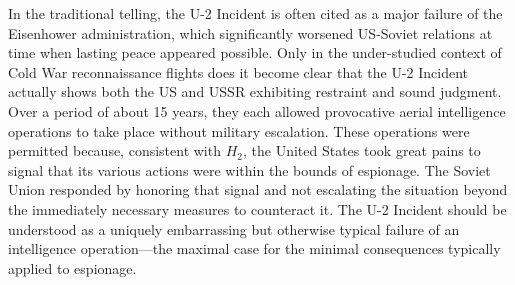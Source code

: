\documentclass[14pt]{extarticle}
\begin{document}
In the traditional telling, the U-2 Incident is often cited as a major failure of the Eisenhower administration, which significantly worsened US-Soviet relations at time when lasting peace appeared possible. Only in the under-studied context of Cold War reconnaissance flights does it become clear that the U-2 Incident actually shows both the US and USSR exhibiting restraint and sound judgment. Over a period of about 15 years, they each allowed provocative aerial intelligence operations to take place without military escalation. These operations were permitted because, consistent with $H_2$, the United States took great pains to signal that its various actions were within the bounds of espionage. The Soviet Union responded by honoring that signal and not escalating the situation beyond the immediately necessary measures to counteract it. The U-2 Incident should be understood as a uniquely embarrassing but otherwise typical failure of an intelligence operation---the maximal case for the minimal consequences typically applied to espionage.




\end{document}

